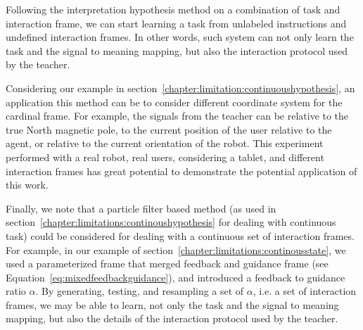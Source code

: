 Following the interpretation hypothesis method on a combination of task and interaction frame, we can start learning a task from unlabeled instructions and undefined interaction frames. In other words, such system can not only learn the task and the signal to meaning mapping, but also the interaction protocol used by the teacher.

Considering our example in section~\ref{chapter:limitation:continuoushypothesis}, an application this method can be to consider different coordinate system for the cardinal frame. For example, the signals from the teacher can be relative to the true North magnetic pole, to the current position of the user relative to the agent, or relative to the current orientation of the robot. This experiment performed with a real robot, real users, considering a tablet, and different interaction frames has great potential to demonstrate the potential application of this work.

Finally, we note that a particle filter based method (as used in section~\ref{chapter:limitations:continoushypothesis} for dealing with continuous task) could be considered for dealing with a continuous set of interaction frames. For example, in our example of section~\ref{chapter:limitations:continousstate}, we used a parameterized frame that merged feedback and guidance frame (see Equation~\ref{eq:mixedfeedbackguidance}), and introduced a feedback to guidance ratio $\alpha$. By generating, testing, and resampling a set of $\alpha$, i.e. a set of interaction frames, we may be able to learn, not only the task and the signal to meaning mapping, but also the details of the interaction protocol used by the teacher.

